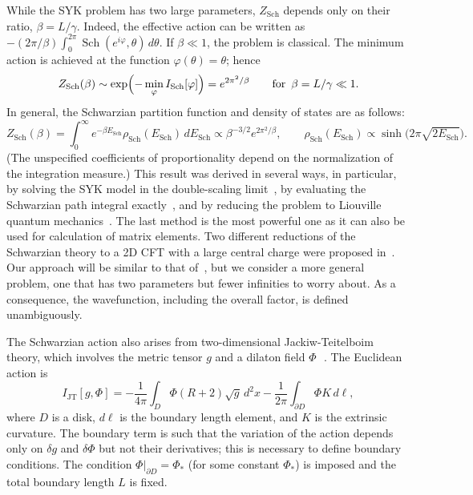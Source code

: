 \documentclass[11pt]{article}
\newcommand{\vp}{\varphi}
\DeclareMathOperator{\Sch}{Sch}
\begin{document}
While the SYK problem has two large parameters, $Z_{\Sch}$ depends only on their ratio, $\beta=L/\gamma$. Indeed, the effective action can be written as $-(2\pi/\beta)\int_{0}^{2\pi}\Sch(e^{i\vp},\theta)\,d\theta$. If $\beta\ll 1$, the problem is classical. The minimum action is achieved at the function $\vp(\theta)=\theta$; hence
\begin{equation}
Z_{\Sch}(\beta) \sim \exp\Bigl(-\min_{\vp} I_{\Sch}[\vp]\Bigr)
=e^{2\pi^2/\beta}\qquad \text{for }\, \beta=L/\gamma\ll 1.
\end{equation}
In general, the Schwarzian partition function and density of states are as follows:
\begin{equation}\label{ZSch}
Z_{\Sch}(\beta) =\int_{0}^{\infty}e^{-\beta E_{\Sch}}\rho_{\Sch}(E_{\Sch})\,dE_{\Sch}
\propto \beta^{-3/2} e^{2\pi^2/\beta},\qquad
\rho_{\Sch}(E_{\Sch}) \propto\sinh\biggl(2\pi\sqrt{2E_{\Sch}}\biggr).
\end{equation}
(The unspecified coefficients of proportionality depend on the normalization of the integration measure.) This result was derived in several ways, in particular, by solving the SYK model in the double-scaling limit~\cite{randmat}, by evaluating the Schwarzian path integral exactly~\cite{StWi17}, and by reducing the problem to Liouville quantum mechanics~\cite{BaAlKa16,BaAlKa17}. The last method is the most powerful one as it can also be used for calculation of matrix elements. Two different reductions of the Schwarzian theory to a 2D CFT with a large central charge were proposed in~\cite{MeTuVe17}. Our approach will be similar to that of~\cite{BaAlKa16,BaAlKa17}, but we consider a more general problem, one that has two parameters but fewer infinities to worry about. As a consequence, the wavefunction, including the overall factor, is defined unambiguously. 

The Schwarzian action also arises from two-dimensional Jackiw-Teitelboim theory, which involves the metric tensor $g$ and a dilaton field $\Phi$\,~\cite{Jen16,MSY16,EMV16}. The Euclidean action is
\begin{equation}\label{IJT}
I_{\text{JT}}[g,\Phi]
=-\frac{1}{4\pi}\int_{D}\Phi(R+2)\sqrt{g}\,d^2x
-\frac{1}{2\pi}\int_{\partial D}\Phi K\,d\ell,
\end{equation}
where $D$ is a disk, $d\ell$ is the boundary length element, and $K$ is the extrinsic curvature. The boundary term is such that the variation of the action depends only on $\delta g$ and $\delta\Phi$ but not their derivatives; this is necessary to define boundary conditions. The condition $\Phi|_{\partial D}=\Phi_*$ (for some constant $\Phi_*$) is imposed and the total boundary length $L$ is fixed.
\end{document}
